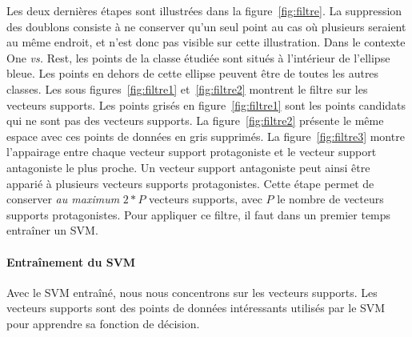 Les deux dernières étapes sont illustrées dans la figure~\ref{fig:filtre}. La suppression des doublons consiste à ne conserver qu'un seul point au cas où plusieurs seraient au même endroit, et n'est donc pas visible sur cette illustration.
Dans le contexte One \textit{vs.} Rest, les points de la classe étudiée sont situés à l'intérieur de l'ellipse bleue. Les points en dehors de cette ellipse peuvent être de toutes les autres classes.
Les sous figures~\ref{fig:filtre1} et~\ref{fig:filtre2} montrent le filtre sur les vecteurs supports. Les points grisés en figure~\ref{fig:filtre1}  sont les points candidats qui ne sont pas des vecteurs supports.
La figure~\ref{fig:filtre2} présente le même espace avec ces points de données en gris supprimés.
La figure~\ref{fig:filtre3} montre l'appairage entre chaque vecteur support protagoniste et le vecteur support antagoniste le plus proche. Un vecteur support antagoniste peut ainsi être apparié à plusieurs vecteurs supports protagonistes. Cette étape permet de conserver \textit{au maximum} $2*P$ vecteurs supports, avec $P$ le nombre de vecteurs supports protagonistes.
Pour appliquer ce filtre, il faut dans un premier temps entraîner un SVM.

\paragraph{Entraînement du SVM}
Avec le SVM entraîné, nous nous concentrons sur les vecteurs supports. Les vecteurs supports sont des points de données intéressants utilisés par le SVM pour apprendre sa fonction de décision.

%
%
%

